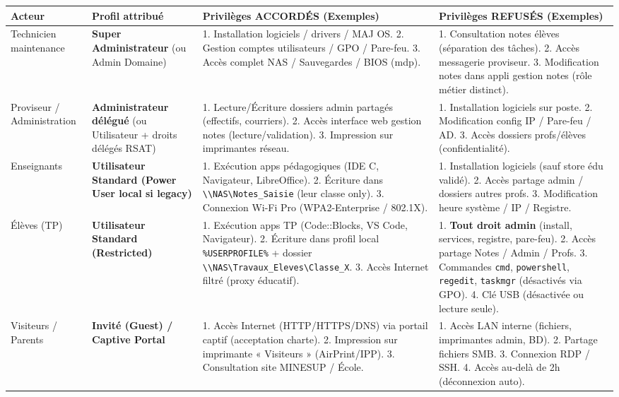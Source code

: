 \documentclass[11pt]{article}
\begin{document}
\begin{exoresolu}
\begin{center}
\begin{tabularx}{\linewidth}{|l|l|X|X|}
\hline
\rowcolor{popblueL}
\textbf{Acteur} & \textbf{Profil attribué} & \textbf{Privilèges ACCORDÉS (Exemples)} & \textbf{Privilèges REFUSÉS (Exemples)} \\
\hline
Technicien maintenance & \textbf{Super Administrateur} (ou Admin Domaine) & 1. Installation logiciels / drivers / MAJ OS. 2. Gestion comptes utilisateurs / GPO / Pare-feu. 3. Accès complet NAS / Sauvegardes / BIOS (mdp). & 1. Consultation notes élèves (séparation des tâches). 2. Accès messagerie proviseur. 3. Modification notes dans appli gestion notes (rôle métier distinct). \\
\hline
Proviseur / Administration & \textbf{Administrateur délégué} (ou Utilisateur + droits délégés RSAT) & 1. Lecture/Écriture dossiers admin partagés (effectifs, courriers). 2. Accès interface web gestion notes (lecture/validation). 3. Impression sur imprimantes réseau. & 1. Installation logiciels sur poste. 2. Modification config IP / Pare-feu / AD. 3. Accès dossiers profs/élèves (confidentialité). \\
\hline
Enseignants & \textbf{Utilisateur Standard (Power User local si legacy)} & 1. Exécution apps pédagogiques (IDE C, Navigateur, LibreOffice). 2. Écriture dans \texttt{\textbackslash\textbackslash NAS\textbackslash Notes\_Saisie} (leur classe only). 3. Connexion Wi-Fi Pro (WPA2-Enterprise / 802.1X). & 1. Installation logiciels (sauf store édu validé). 2. Accès partage admin / dossiers autres profs. 3. Modification heure système / IP / Registre. \\
\hline
Élèves (TP) & \textbf{Utilisateur Standard (Restricted)} & 1. Exécution apps TP (Code::Blocks, VS Code, Navigateur). 2. Écriture dans profil local \texttt{\%USERPROFILE\%} + dossier \texttt{\textbackslash\textbackslash NAS\textbackslash Travaux\_Eleves\textbackslash Classe\_X}. 3. Accès Internet filtré (proxy éducatif). & 1. \textbf{Tout droit admin} (install, services, registre, pare-feu). 2. Accès partage Notes / Admin / Profs. 3. Commandes \texttt{cmd}, \texttt{powershell}, \texttt{regedit}, \texttt{taskmgr} (désactivés via GPO). 4. Clé USB (désactivée ou lecture seule). \\
\hline
Visiteurs / Parents & \textbf{Invité (Guest) / Captive Portal} & 1. Accès Internet (HTTP/HTTPS/DNS) via portail captif (acceptation charte). 2. Impression sur imprimante « Visiteurs » (AirPrint/IPP). 3. Consultation site MINESUP / École. & 1. Accès LAN interne (fichiers, imprimantes admin, BD). 2. Partage fichiers SMB. 3. Connexion RDP / SSH. 4. Accès au-delà de 2h (déconnexion auto). \\
\hline
\end{tabularx}
\end{center}


\end{exoresolu}
\end{document}
